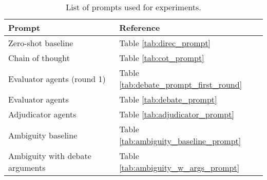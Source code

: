 \begin{table}
\centering
\begin{tabular}{@{}l|l@{}}
\toprule
\textbf{Prompt}  & \textbf{Reference}
\\ 
\midrule
Zero-shot baseline & Table \ref{tab:direc_prompt}
\\
Chain of thought & Table \ref{tab:cot_prompt}
\\
Evaluator agents (round 1) & Table \ref{tab:debate_prompt_first_round}
\\
Evaluator agents & Table \ref{tab:debate_prompt}
\\
Adjudicator agents& Table \ref{tab:adjudicator_prompt}
\\
Ambiguity baseline & Table \ref{tab:ambiguity_baseline_prompt}
\\
Ambiguity with debate arguments & Table \ref{tab:ambiguity_w_args_prompt}
\\
\bottomrule
\end{tabular}
\caption{List of prompts used for experiments.}
\label{tab:prompt_lists}
\end{table}